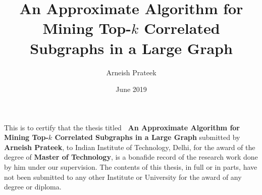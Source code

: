 \documentclass[MTech]{iitddiss}
\begin{document}

\title{An Approximate Algorithm for Mining Top-$k$ Correlated Subgraphs in a Large Graph}

\author{Arneish Prateek}
\date{June 2019}

\maketitle







%
%
%


\certificate

\vspace*{0.5in}

\noindent This is to certify that the thesis titled {\bf\ An Approximate
Algorithm for Mining Top-$k$ Correlated Subgraphs in a Large Graph} submitted
by {\bf Arneish Prateek}, to Indian Institute of Technology, Delhi, for
the award of the degree of {\bf Master of Technology}, is a bonafide
record of the research work done by him under our supervision.  The
contents of this thesis, in full or in parts, have not been submitted
to any other Institute or University for the award of any degree or
diploma.
\end{document}
